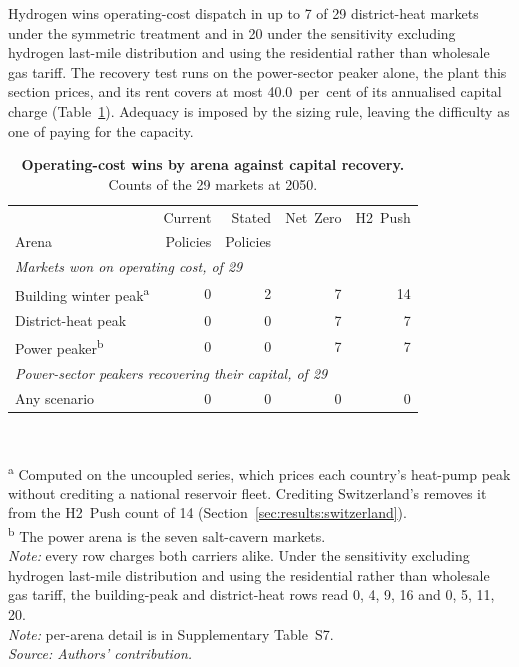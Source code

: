 Hydrogen wins operating-cost dispatch in up to 7 of 29 district-heat markets under the
symmetric treatment and in 20 under the sensitivity excluding hydrogen last-mile
distribution and using the residential rather than wholesale gas tariff. The recovery test runs on the power-sector
peaker alone, the plant this section prices, and its rent covers at most 40.0~per~cent of its annualised capital charge (Table~\ref{tab:arenas_body}). Adequacy is imposed by the sizing rule, leaving the difficulty as one of paying for the capacity.

\begin{table}[htbp]
 \centering
 \caption{\textbf{Operating-cost wins by arena against capital recovery.} Counts of the
 29 markets at 2050.}
 \label{tab:arenas_body}
 \begin{tabular}{lrrrr}
 \toprule
 & Current & Stated & Net~Zero & H2~Push \\
 Arena & Policies & Policies & & \\
 \midrule
 \multicolumn{5}{l}{\textit{Markets won on operating cost, of 29}} \\
 Building winter peak\textsuperscript{a} & 0 & 2 & 7 & 14 \\
 District-heat peak & 0 & 0 & 7 & 7 \\
 Power peaker\textsuperscript{b} & 0 & 0 & 7 & 7 \\
 \midrule
 \multicolumn{5}{l}{\textit{Power-sector peakers recovering their capital, of 29}} \\
 Any scenario & 0 & 0 & 0 & 0 \\
 \bottomrule
 \end{tabular}
 \\[3pt]{\footnotesize\raggedright
 \textsuperscript{a} Computed on the uncoupled series, which prices each country's
 heat-pump peak without crediting a national reservoir fleet. Crediting Switzerland's
 removes it from the H2~Push count of 14 (Section~\ref{sec:results:switzerland}).\\
 \textsuperscript{b} The power arena is the seven salt-cavern markets.\\
 \textit{Note:} every row charges both carriers alike. Under the sensitivity excluding hydrogen last-mile distribution and using the residential rather than wholesale gas tariff, the building-peak and district-heat rows read 0, 4, 9, 16 and 0, 5, 11, 20.\\
 \textit{Note:} per-arena detail is in Supplementary Table~S7.\\
 \textit{Source: Authors' contribution.}\par}
\end{table}

